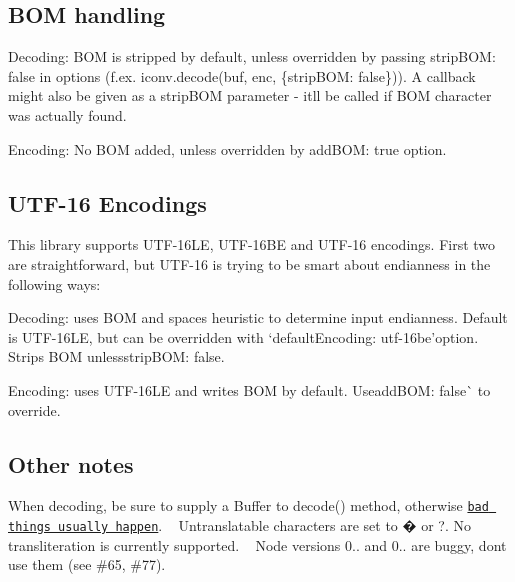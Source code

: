 \subsection*{B\+OM handling}


\begin{DoxyItemize}
\item Decoding\+: B\+OM is stripped by default, unless overridden by passing {\ttfamily strip\+B\+OM\+: false} in options (f.\+ex. {\ttfamily iconv.\+decode(buf, enc, \{strip\+B\+OM\+: false\})}). A callback might also be given as a {\ttfamily strip\+B\+OM} parameter -\/ it\textquotesingle{}ll be called if B\+OM character was actually found.
\item Encoding\+: No B\+OM added, unless overridden by {\ttfamily add\+B\+OM\+: true} option.
\end{DoxyItemize}

\subsection*{U\+T\+F-\/16 Encodings}

This library supports U\+T\+F-\/16\+LE, U\+T\+F-\/16\+BE and U\+T\+F-\/16 encodings. First two are straightforward, but U\+T\+F-\/16 is trying to be smart about endianness in the following ways\+:
\begin{DoxyItemize}
\item Decoding\+: uses B\+OM and \textquotesingle{}spaces heuristic\textquotesingle{} to determine input endianness. Default is U\+T\+F-\/16\+LE, but can be overridden with `default\+Encoding\+: \textquotesingle{}utf-\/16be'{\ttfamily option. Strips B\+OM unless}strip\+B\+OM\+: false{\ttfamily .}
\item {\ttfamily Encoding\+: uses U\+T\+F-\/16\+LE and writes B\+OM by default. Use}add\+B\+OM\+: false\`{} to override.
\end{DoxyItemize}

\subsection*{Other notes}

When decoding, be sure to supply a Buffer to decode() method, otherwise \href{https://github.com/ashtuchkin/iconv-lite/wiki/Use-Buffers-when-decoding}{\tt bad things usually happen}. ~\newline
Untranslatable characters are set to � or ?. No transliteration is currently supported. ~\newline
Node versions 0.. and 0.. are buggy, don\textquotesingle{}t use them (see \#65, \#77). ~\newline
